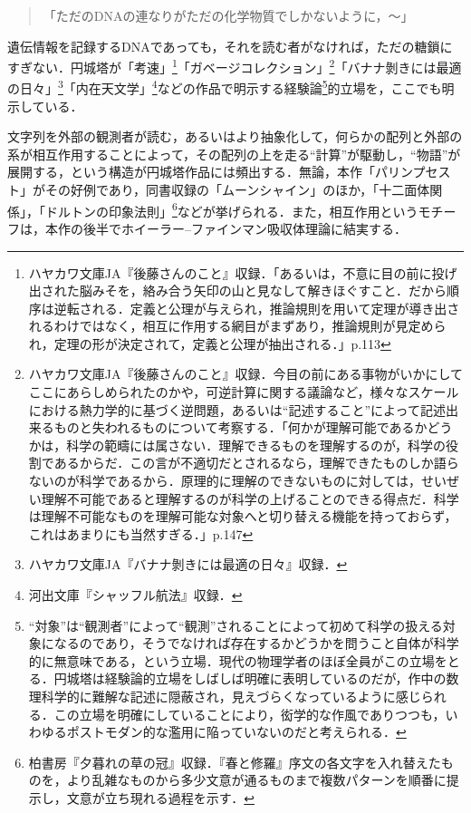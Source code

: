 \documentclass[10pt, a5paper, twoside]{jsarticle}
\theoremstyle{definition}
\begin{document}
			\begin{quote}

				「ただのDNAの連なりがただの化学物質でしかないように，〜」
				
			\end{quote}

			遺伝情報を記録するDNAであっても，それを読む者がなければ，ただの糖鎖にすぎない．円城塔が「考速」\footnote{ハヤカワ文庫JA『後藤さんのこと』収録．「あるいは，不意に目の前に投げ出された脳みそを，絡み合う矢印の山と見なして解きほぐすこと．だから順序は逆転される．定義と公理が与えられ，推論規則を用いて定理が導き出されるわけではなく，相互に作用する網目がまずあり，推論規則が見定められ，定理の形が決定されて，定義と公理が抽出される．」\cite{goto}p.113}「ガベージコレクション」\footnote{ハヤカワ文庫JA『後藤さんのこと』収録．今目の前にある事物がいかにしてここにあらしめられたのかや，可逆計算に関する議論など，様々なスケールにおける熱力学的に基づく逆問題，あるいは“記述すること”によって記述出来るものと失われるものについて考察する．「何かが理解可能であるかどうかは，科学の範疇には属さない．理解できるものを理解するのが，科学の役割であるからだ．この言が不適切だとされるなら，理解できたものしか語らないのが科学であるから．原理的に理解のできないものに対しては，せいぜい理解不可能であると理解するのが科学の上げることのできる得点だ．科学は理解不可能なものを理解可能な対象へと切り替える機能を持っておらず，これはあまりにも当然すぎる．」\cite{goto}p.147}「バナナ剝きには最適の日々」\footnote{ハヤカワ文庫JA『バナナ剝きには最適の日々』収録．}「内在天文学」\footnote{河出文庫『シャッフル航法』収録．}などの作品で明示する経験論\footnote{“対象”は“観測者”によって“観測”されることによって初めて科学の扱える対象になるのであり，そうでなければ存在するかどうかを問うこと自体が科学的に無意味である，という立場．現代の物理学者のほぼ全員がこの立場をとる．円城塔は経験論的立場をしばしば明確に表明しているのだが，作中の数理科学的に難解な記述に隠蔽され，見えづらくなっているように感じられる．この立場を明確にしていることにより，衒学的な作風でありつつも，いわゆるポストモダン的な濫用に陥っていないのだと考えられる．}的立場を，ここでも明示している．

			文字列を外部の観測者が読む，あるいはより抽象化して，何らかの配列と外部の系が相互作用することによって，その配列の上を走る“計算”が駆動し，“物語”が展開する，という構造が円城塔作品には頻出する．無論，本作「パリンプセスト」がその好例であり，同書収録の「ムーンシャイン」のほか，「十二面体関係」，「ドルトンの印象法則」\footnote{柏書房『夕暮れの草の冠』収録．『春と修羅』序文の各文字を入れ替えたものを，より乱雑なものから多少文意が通るものまで複数パターンを順番に提示し，文意が立ち現れる過程を示す．}などが挙げられる．また，相互作用というモチーフは，本作の後半でホイーラー--ファインマン吸収体理論に結実する．
\end{document}
